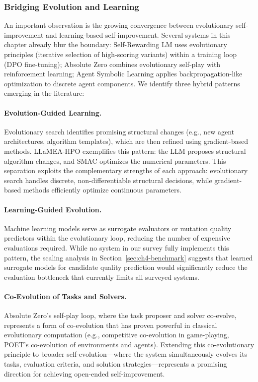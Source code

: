\subsubsection{Bridging Evolution and Learning}

An important observation is the growing convergence between evolutionary self-improvement and learning-based self-improvement. Several systems in this chapter already blur the boundary: Self-Rewarding LM uses evolutionary principles (iterative selection of high-scoring variants) within a training loop (DPO fine-tuning); Absolute Zero combines evolutionary self-play with reinforcement learning; Agent Symbolic Learning applies backpropagation-like optimization to discrete agent components. We identify three hybrid patterns emerging in the literature:

\paragraph{Evolution-Guided Learning.}
Evolutionary search identifies promising structural changes (e.g., new agent architectures, algorithm templates), which are then refined using gradient-based methods. LLaMEA-HPO exemplifies this pattern: the LLM proposes structural algorithm changes, and SMAC optimizes the numerical parameters. This separation exploits the complementary strengths of each approach: evolutionary search handles discrete, non-differentiable structural decisions, while gradient-based methods efficiently optimize continuous parameters.

\paragraph{Learning-Guided Evolution.}
Machine learning models serve as surrogate evaluators or mutation quality predictors within the evolutionary loop, reducing the number of expensive evaluations required. While no system in our survey fully implements this pattern, the scaling analysis in Section~\ref{sec:ch4-benchmark} suggests that learned surrogate models for candidate quality prediction would significantly reduce the evaluation bottleneck that currently limits all surveyed systems.

\paragraph{Co-Evolution of Tasks and Solvers.}
Absolute Zero's self-play loop, where the task proposer and solver co-evolve, represents a form of co-evolution that has proven powerful in classical evolutionary computation (e.g., competitive co-evolution in game-playing, POET's co-evolution of environments and agents). Extending this co-evolutionary principle to broader self-evolution---where the system simultaneously evolves its tasks, evaluation criteria, and solution strategies---represents a promising direction for achieving open-ended self-improvement.


